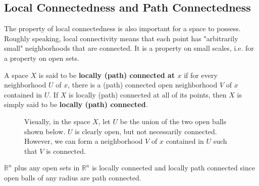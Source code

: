 \subsection{Local Connectedness and Path Connectedness}

  The property of local connectedness is also important for a space to possess. Roughly speaking, local connectivity means that each point has "arbitrarily small" neighborhoods that are connected. It is a property on small scales, i.e. for a property on open sets. 

  \begin{definition}
    A space $X$ is said to be \textbf{locally (path) connected at $x$} if for every neighborhood $U$ of $x$, there is a (path) connected open neighborhood $V$ of $x$ contained in $U$. If $X$ is locally (path) connected at all of its points, then $X$ is simply said to be \textbf{locally (path) connected}. 

    \begin{figure}[H]
      \centering 
      \caption{Visually, in the space $X$, let $U$ be the union of the two open balls shown below. $U$ is clearly open, but not necessarily connected. However, we can form a  neighborhood $V$ of $x$ contained in $U$ such that $V$ is connected. }
      \label{fig:locally_connected}
    \end{figure}
  \end{definition} 

  \begin{example}
    $\mathbb{R}^n$ plus any open sets in $\mathbb{R}^n$ is locally connected and locally path connected since open balls of any radius are path connected. 
  \end{example} 

